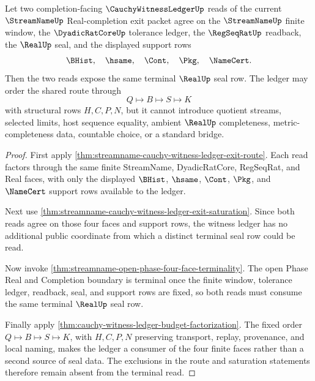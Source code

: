 \begin{theorem}
\label{thm:streamname-cauchy-witness-ledger-terminal-determinacy}
Let two completion-facing $\CauchyWitnessLedgerUp$ reads of the current $\StreamNameUp$ Real-completion exit packet agree on the $\StreamNameUp$ finite window, the $\DyadicRatCoreUp$ tolerance ledger, the $\RegSeqRatUp$ readback, the $\RealUp$ seal, and the displayed support rows
$$
\BHist,\quad \hsame,\quad \Cont,\quad \Pkg,\quad \NameCert.
$$
Then the two reads expose the same terminal $\RealUp$ seal row. The ledger may order the shared route through
$$
Q \longmapsto B \longmapsto S \longmapsto K
$$
with structural rows $H,C,P,N$, but it cannot introduce quotient streams, selected limits, host sequence equality, ambient $\RealUp$ completeness, metric-completeness data, countable choice, or a standard bridge.
\end{theorem}
\begin{proof}
First apply \autoref{thm:streamname-cauchy-witness-ledger-exit-route}. Each read factors through the same finite StreamName, DyadicRatCore, RegSeqRat, and Real faces, with only the displayed $\BHist$, $\hsame$, $\Cont$, $\Pkg$, and $\NameCert$ support rows available to the ledger.

Next use \autoref{thm:streamname-cauchy-witness-ledger-exit-saturation}. Since both reads agree on those four faces and support rows, the witness ledger has no additional public coordinate from which a distinct terminal seal row could be read.

Now invoke \autoref{thm:streamname-open-phase-four-face-terminality}. The open Phase Real and Completion boundary is terminal once the finite window, tolerance ledger, readback, seal, and support rows are fixed, so both reads must consume the same terminal $\RealUp$ seal row.

Finally apply \autoref{thm:cauchy-witness-ledger-budget-factorization}. The fixed order $Q \longmapsto B \longmapsto S \longmapsto K$, with $H,C,P,N$ preserving transport, replay, provenance, and local naming, makes the ledger a consumer of the four finite faces rather than a second source of seal data. The exclusions in the route and saturation statements therefore remain absent from the terminal read.
\end{proof}
